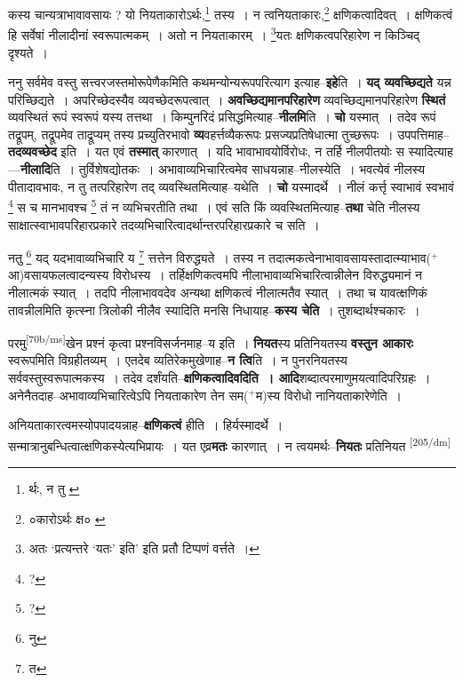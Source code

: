 \documentclass[article,12pt,a4paper]{memoir}
\newcommand{\add}[1]{($^{+}$#1)}
\begin{document}
	  \pstart कस्य चान्यत्राभावावसायः ? यो नियताकारोऽर्थः,\footnote{र्थः, न तु \cite{dp-edE}} तस्य । न त्वनियताकारः,\footnote{०कारोऽर्थः क्ष० \cite{dp-msA} \cite{dp-msB} \cite{dp-edP} \cite{dp-edH} \cite{dp-edE} \cite{dp-edN}} क्षणिकत्वादिवत् । क्षणिकत्वं हि सर्वेषां नीलादीनां स्वरूपात्मकम् । अतो न नियताकारम् । \footnote{अतः \cite{dp-msD} \cite{dp-edE} ‘प्रत्यन्तरे ‘यतः’ इति’ इति \cite{dp-msD} प्रतौ टिप्पणं वर्त्तते ।}यतः क्षणिकत्वपरिहारेण न किञ्चिद् दृश्यते ।
	\pend
      

	  \pstart ननु सर्वमेव वस्तु सत्त्वरजस्तमोरूपेणैकमिति कथमन्योन्यरूपपरित्याग इत्याह--\textbf{इहे}ति । \textbf{यद् व्यवच्छिद्यते} यन्न परिच्छिद्यते । अपरिच्छेदस्यैव व्यवच्छेदरूपत्वात् । \textbf{अवच्छिद्यमानपरिहारेण} व्यवच्छिद्यमानपरिहारेण \textbf{स्थितं} व्यवस्थितं रूपं स्वरूपं यस्य तत्तथा । किम्पुनरिदं प्रसिद्धमित्याह--\textbf{नीलमि}ति । \textbf{चो} यस्मात् । तदेव रूपं तद्रूपम्, तद्रूपमेव ताद्रूप्यम् तस्य प्रच्युतिरभावो \textbf{व्य}वहर्त्तव्यैकरूपः प्रसज्यप्रतिषेधात्मा तुच्छरूपः । उपपत्तिमाह--\textbf{तदव्यवच्छेद} इति । यत एवं \textbf{तस्मात्} कारणात् । यदि भावाभावयोर्विरोधः, न तर्हि नीलपीतयोः स स्यादित्याह—\textbf{नीलादि}ति । तुर्विशेषद्योतकः । अभावाव्यभिचारित्वमेव साधयन्नाह--नीलस्येति । भवत्येवं नीलस्य पीतादावभावः, न तु तत्परिहारेण तद् व्यवस्थितमित्याह--यथेति । \textbf{चो} यस्मादर्थे । नीलं कर्त्तृ स्वाभावं स्वभावं \footnote{?} स च मानभावश्च \footnote{?} तं न व्यभिचरतीति तथा । एवं सति किं व्यवस्थितमित्याह--\textbf{तथा} चेति नीलस्य साक्षात्स्वाभावपरिहारप्रकारे तदव्यभिचारित्वादर्थान्तरपरिहारप्रकारे च सति ।
	\pend
      

	  \pstart नतु \footnote{नु} यद् यदभावाव्यभिचारि य \footnote{त} त्तत्तेन विरुद्ध्यते । तस्य न तदात्मकत्वेनाभावावसायस्तादात्म्याभाव\add{आ}वसायफलत्वादन्यस्य विरोधस्य । तर्हिक्षणिकत्वमपि नीलाभावाव्यभिचारित्वान्नीलेन विरुद्ध्यमानं न नीलात्मकं स्यात् । तदपि नीलाभाववदेव अन्यथा क्षणिकत्वं नीलात्मतैव स्यात् । तथा च यावत्क्षणिकं तावन्नीलमिति कृत्स्ना त्रिलोकी नीलैव स्यादिति मनसि निधायाह--\textbf{कस्य चेति} । तुशब्दार्थश्चकारः ।
	\pend
      

	  \pstart परमु\leavevmode\textsuperscript{\rmlatinfont\tiny [70b/ms]}खेन प्रश्नं कृत्वा प्रश्नविसर्जनमाह--य इति । \textbf{नियत}स्य प्रतिनियतस्य \textbf{वस्तुन आकारः} स्वरूपमिति विग्रहीतव्यम् । एतदेब व्यतिरेकमुखेणाह--\textbf{न त्वि}ति । न पुनरनियतस्य सर्ववस्तुस्वरूपात्मकस्य । तदेव दर्शंयति--\textbf{क्षणिकत्वादिवदिति । आदि}शब्दात्परमाणुमयत्वादिपरिग्रहः । अनेनैतदाह--अभावाव्यभिचारित्वेऽपि नियताकारेण तेन सम\add{म}स्य विरोधो नानियताकारेणेति ।
	\pend
      

	  \pstart अनियताकारत्वमस्योपपादयन्नाह--\textbf{क्षणिकत्वं} हीति । हिर्यस्मादर्थे । सन्मात्रानुबन्धित्वात्क्षणिकस्येत्यभिप्रायः । यत एव्र\textbf{मतः} कारणात् । न त्वयमर्थः--\textbf{नियतः} प्रतिनियत  \leavevmode\textsuperscript{\rmlatinfont\tiny [205/dm]} 
	  
\end{document}
